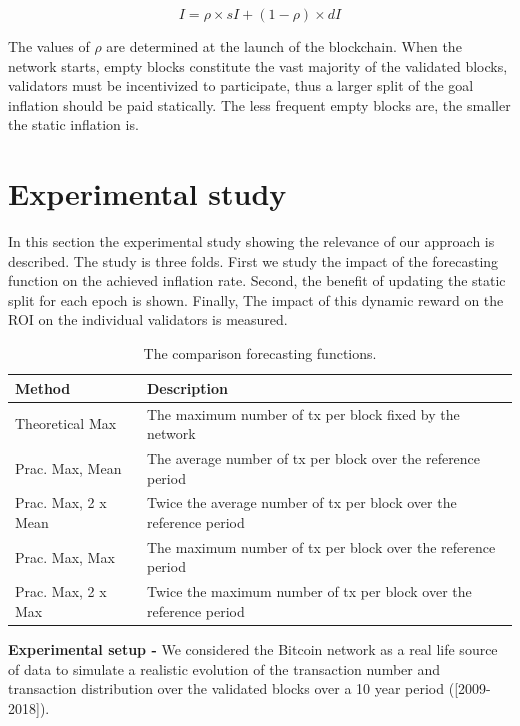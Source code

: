 \documentclass[conference]{IEEEtran}
\begin{document}
\begin{equation}
    I=\rho \times sI + (1 - \rho) \times dI	
    \label{eq:inflationsplitRho}
\end{equation}

The values of $\rho$ are determined at the launch of the blockchain. When the network starts, empty blocks constitute the vast majority of the validated blocks, validators must be incentivized to participate, thus a larger split of the goal inflation should be paid statically. The less frequent empty blocks are, the smaller the static inflation is. 

\section{Experimental study}
\label{sec:experiements}
In this section the experimental study showing the relevance of our approach is described. The study is three folds. First we study the impact of the forecasting function on the achieved inflation rate. Second, the benefit of updating the static split for each epoch is shown. Finally, The impact of this dynamic reward on the ROI on the individual validators is measured.

\begin{table}[t]
	\centering
    \def\arraystretch{2}
	\caption{The comparison forecasting functions.}
	\begin{tabular}{|l|l|} 
		\hline
		Method & Description \\  
		\hline\hline
		Theoretical Max & The maximum number of tx per block fixed by the network\\ 
		\hline
		Prac. Max, Mean & The average number of tx per block over the reference period  \\
		\hline
		Prac. Max, 2 x Mean & Twice the average number of tx per block over the reference period \\
		\hline
		Prac. Max, Max & The maximum number of tx per block over the reference period \\
		\hline
		Prac. Max, 2 x Max & Twice the maximum number of tx per block over the reference period \\
		\hline
	\end{tabular}
\label{tab:forecast}
\end{table}

\textbf{Experimental setup -} We considered the Bitcoin network as a real life source of data to simulate a realistic evolution of the transaction number and transaction distribution over the validated blocks over a  10 year period ([2009-2018]). 
\end{document}
